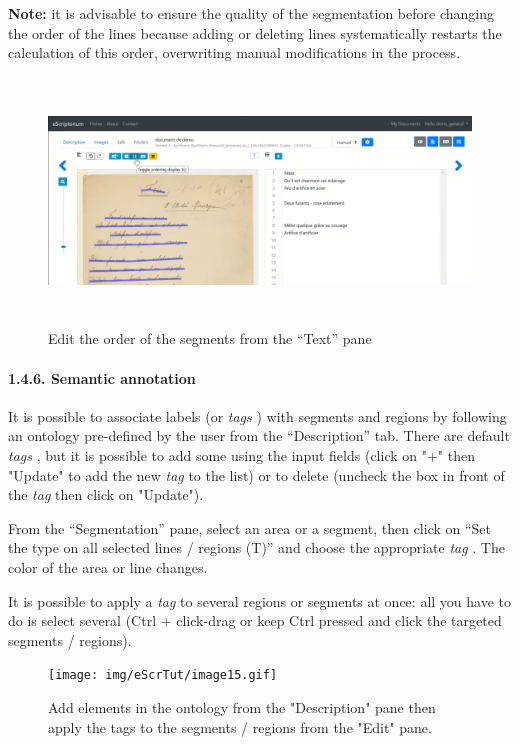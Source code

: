 \documentclass[
]{book}
\begin{document}
\textbf{Note:} it is advisable to ensure the quality of the segmentation
before changing the order of the lines because adding or deleting lines
systematically restarts the calculation of this order, overwriting
manual modifications in the process.

\begin{figure}
\centering
\includegraphics[width=6.5in,height=2.58333in]{img/eScrTut/image14.gif}
\caption{Edit the order of the segments from the ``Text'' pane}
\end{figure}

\hypertarget{semantic-annotation}{%
\paragraph{1.4.6. Semantic annotation}\label{semantic-annotation}}

It is possible to associate labels (or \emph{tags} ) with segments and
regions by following an ontology pre-defined by the user from the
``Description'' tab. There are default \emph{tags} , but it is possible to add
some using the input fields (click on "+" then "Update" to add the
new \emph{tag} to the list) or to delete (uncheck the box in front of the
\emph{tag} then click on "Update").

From the ``Segmentation'' pane, select an area or a segment, then click on
``Set the type on all selected lines / regions (T)'' and choose the
appropriate \emph{tag} . The color of the area or line changes.

It is possible to apply a \emph{tag} to several regions or segments at once:
all you have to do is select several (Ctrl + click-drag or keep Ctrl
pressed and click the targeted segments / regions).

\begin{figure}
\centering
\texttt{[image: img/eScrTut/image15.gif]}
\caption{Add elements in the ontology from the "Description" pane then apply
the tags to the segments / regions from the "Edit"
pane.}
\end{figure}
\end{document}
